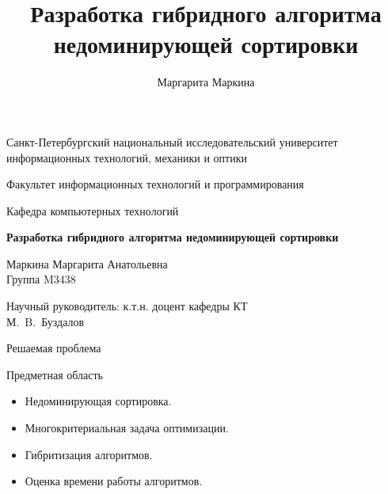 \documentclass{beamer}
\title[Недоминирующая сортировка]{Разработка гибридного алгоритма недоминирующей сортировки}
\author[Маргарита Маркина]{Маргарита Маркина}
\institute[]{Национальный исследовательский университет информационных технологий, механики и оптики}
\date{}
\begin{document}
\begin{frame}
\begin{center}
{\scriptsize Санкт-Петербургский национальный исследовательский университет \\ информационных технологий, механики и оптики}

\vspace{1cm}

{\scriptsize Факультет информационных технологий и программирования

Кафедра компьютерных технологий}

\vspace{1cm}

\vbox{\large\bfseries
Разработка гибридного алгоритма недоминирующей сортировки}

\vspace{1cm}

{\large Маркина Маргарита Анатольевна \\}
{\large Группа M3438}


\vspace{1cm}

{\large Научный руководитель: к.т.н. доцент кафедры КТ \\}
{\large М.~B.~Буздалов}


\end{center}
\end{frame}


\begin{frame}{Решаемая проблема}
\begin{block}{Предметная область}
\begin{itemize}
\item Недоминирующая сортировка.
\item Многокритериальная задача оптимизации.
\item Гибритизация алгоритмов.
\item Оценка времени работы алгоритмов.
\end{itemize}
\end{block}
\end{frame}
\end{document}
